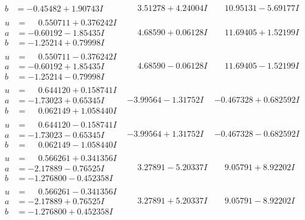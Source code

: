\documentclass[1p]{elsarticle_modified}
\theoremstyle{definition}
\begin{document}
$$\begin{array}{c|c|c}
\begin{aligned}
b &= -0.45482 + 1.90743 I\end{aligned}
 & \phantom{-}3.51278 + 4.24004 I & \phantom{-}10.95131 - 5.69177 I \\ \hline\begin{aligned}
u &= \phantom{-}0.550711 + 0.376242 I \\
a &= -0.60192 - 1.85435 I \\
b &= -1.25214 + 0.79998 I\end{aligned}
 & \phantom{-}4.68590 + 0.06128 I & \phantom{-}11.69405 + 1.52199 I \\ \hline\begin{aligned}
u &= \phantom{-}0.550711 - 0.376242 I \\
a &= -0.60192 + 1.85435 I \\
b &= -1.25214 - 0.79998 I\end{aligned}
 & \phantom{-}4.68590 - 0.06128 I & \phantom{-}11.69405 - 1.52199 I \\ \hline\begin{aligned}
u &= \phantom{-}0.644120 + 0.158741 I \\
a &= -1.73023 + 0.65345 I \\
b &= \phantom{-}0.062149 + 1.058440 I\end{aligned}
 & -3.99564 - 1.31752 I & -0.467328 + 0.682592 I \\ \hline\begin{aligned}
u &= \phantom{-}0.644120 - 0.158741 I \\
a &= -1.73023 - 0.65345 I \\
b &= \phantom{-}0.062149 - 1.058440 I\end{aligned}
 & -3.99564 + 1.31752 I & -0.467328 - 0.682592 I \\ \hline\begin{aligned}
u &= \phantom{-}0.566261 + 0.341356 I \\
a &= -2.17889 - 0.76525 I \\
b &= -1.276800 - 0.452358 I\end{aligned}
 & \phantom{-}3.27891 - 5.20337 I & \phantom{-}9.05791 + 8.92202 I \\ \hline\begin{aligned}
u &= \phantom{-}0.566261 - 0.341356 I \\
a &= -2.17889 + 0.76525 I \\
b &= -1.276800 + 0.452358 I\end{aligned}
 & \phantom{-}3.27891 + 5.20337 I & \phantom{-}9.05791 - 8.92202 I \\ \hline\begin{aligned}

\end{aligned}
\end{array}$$
\end{document}
